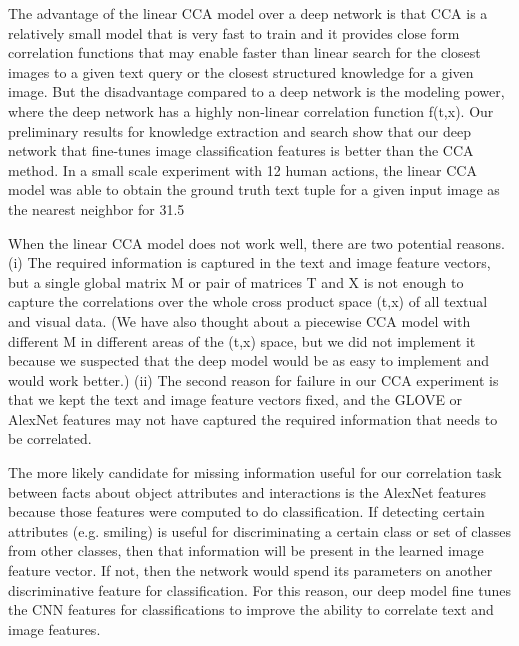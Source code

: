 \documentclass[runningheads]{llncs}
\begin{document}
The advantage of the linear CCA model over a deep network is that CCA is a relatively small model that is very fast to train and it provides close form correlation functions that may enable faster than linear search for the closest images to a given text query or the closest structured knowledge for a given image. But the disadvantage compared to a deep network is the modeling power, where the deep network has a highly non-linear correlation function f(t,x). Our preliminary results for knowledge extraction and search show that our deep network that fine-tunes image classification features is better than the CCA method. In a small scale experiment with 12 human actions, the linear CCA model was able to obtain the ground truth text tuple for a given input image as the nearest neighbor for 31.5%

When the linear CCA model does not work well, there are two potential reasons. (i) The required information is captured in the text and image feature vectors, but a single global matrix M or pair of matrices T and X is not enough to capture the correlations over the whole cross product space (t,x) of all textual and visual data. (We have also thought about a piecewise CCA model with different M in different areas of the (t,x) space, but we did not implement it because we suspected that the deep model would be as easy to implement and would work better.) (ii) The second reason for failure in our CCA experiment is that we kept the text and image feature vectors fixed, and the GLOVE or AlexNet features may not have captured the required information that needs to be correlated.

The more likely candidate for missing information useful for our correlation task between facts about object attributes and interactions is the AlexNet features because those features were computed to do classification. If detecting certain attributes (e.g. smiling) is useful for discriminating a certain class or set of classes from other classes, then that information will be present in the learned image feature vector. If not, then the network would spend its parameters on another discriminative feature for classification. For this reason, our deep model fine tunes the CNN features for classifications to improve the ability to correlate text and image features.
\end{document}

